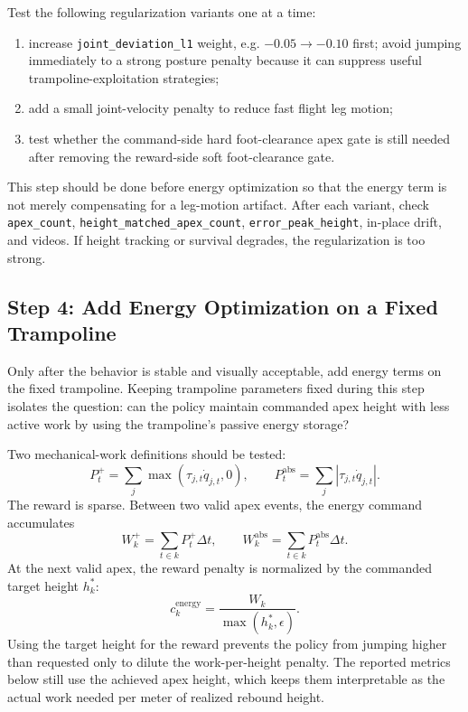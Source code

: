\documentclass[11pt, a4paper]{article}
\begin{document}
Test the following regularization variants one at a time:
\begin{enumerate}
    \item increase \texttt{joint\_deviation\_l1} weight, e.g.
    $-0.05 \rightarrow -0.10$ first; avoid jumping immediately to a strong
    posture penalty because it can suppress useful trampoline-exploitation
    strategies;
    \item add a small joint-velocity penalty to reduce fast flight leg motion;
    \item test whether the command-side hard foot-clearance apex gate is still
    needed after removing the reward-side soft foot-clearance gate.
\end{enumerate}
This step should be done before energy optimization so that the energy term is
not merely compensating for a leg-motion artifact. After each variant, check
\texttt{apex\_count}, \texttt{height\_matched\_apex\_count},
\texttt{error\_peak\_height}, in-place drift, and videos. If height tracking or
survival degrades, the regularization is too strong.

\subsection{Step 4: Add Energy Optimization on a Fixed Trampoline}

Only after the behavior is stable and visually acceptable, add energy terms on
the fixed trampoline. Keeping trampoline parameters fixed during this step
isolates the question: can the policy maintain commanded apex height with less
active work by using the trampoline's passive energy storage?

Two mechanical-work definitions should be tested:
\[
    P^{+}_t =
    \sum_j \max(\tau_{j,t}\dot{q}_{j,t}, 0),
    \qquad
    P^{\mathrm{abs}}_t =
    \sum_j |\tau_{j,t}\dot{q}_{j,t}|.
\]
The reward is sparse. Between two valid apex events, the energy command
accumulates
\[
    W^{+}_k=\sum_{t\in k}P^{+}_t\Delta t,
    \qquad
    W^{\mathrm{abs}}_k=\sum_{t\in k}P^{\mathrm{abs}}_t\Delta t.
\]
At the next valid apex, the reward penalty is normalized by the commanded target
height $h^{*}_k$:
\[
    c^{\mathrm{energy}}_k =
    \frac{W_k}{\max(h^{*}_k,\epsilon)}.
\]
Using the target height for the reward prevents the policy from jumping higher
than requested only to dilute the work-per-height penalty. The reported metrics
below still use the achieved apex height, which keeps them interpretable as the
actual work needed per meter of realized rebound height.
\end{document}
